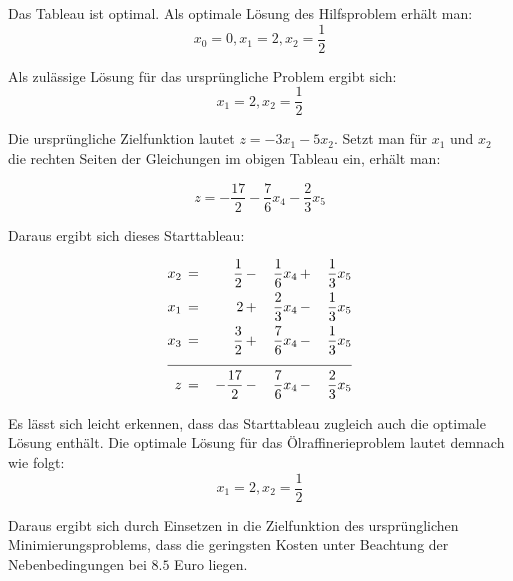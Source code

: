 \documentclass[10pt,a4paper,oneside,ngerman,numbers=noenddot]{scrartcl}
\begin{document}
		Das Tableau ist optimal. Als optimale Lösung des Hilfsproblem erhält man:
		\[
			x_{0} = 0, x_{1} = 2, x_{2} = \frac{1}{2}
		\]
		
		Als zulässige Lösung für das ursprüngliche Problem ergibt sich:
		\[
			x_{1} = 2, x_{2} = \frac{1}{2}
		\]
		
		Die ursprüngliche Zielfunktion lautet $z = -3x_{1} - 5x_{2}$. Setzt man für $x_{1}$ und $x_{2}$ die rechten Seiten der Gleichungen im obigen Tableau ein, erhält man:
		
		\[
			z = -\frac{17}{2} - \frac{7}{6}x_{4} - \frac{2}{3}x_{5}
		\]
		
		Daraus ergibt sich dieses Starttableau:
		
		\begin{alignat*}{4}
			x_{2} \,&=&\, \frac{1}{2} \,&-&\, \frac{1}{6}x_{4} \,&+&\, \frac{1}{3}x_{5} \\
			x_{1} \,&=&\, 2 \,&+&\, \frac{2}{3}x_{4} \,&-&\, \frac{1}{3}x_{5} \\
			x_{3} \,&=&\, \frac{3}{2} \,&+&\, \frac{7}{6}x_{4} \,&-&\, \frac{1}{3}x_{5} \\ \cline{1 - 7}
			z \,&=&\, -\frac{17}{2} \,&-&\, \frac{7}{6}x_{4} \,&-&\, \frac{2}{3}x_{5}
		\end{alignat*}
		
		Es lässt sich leicht erkennen, dass das Starttableau zugleich auch die optimale Lösung enthält. Die optimale Lösung für das Ölraffinerieproblem lautet demnach wie folgt:
		\[
			x_{1} = 2, x_{2} = \frac{1}{2}
		\]
		
		Daraus ergibt sich durch Einsetzen in die Zielfunktion des ursprünglichen Minimierungsproblems, dass die geringsten Kosten unter Beachtung der Nebenbedingungen bei $8.5$ Euro liegen.
\end{document}
